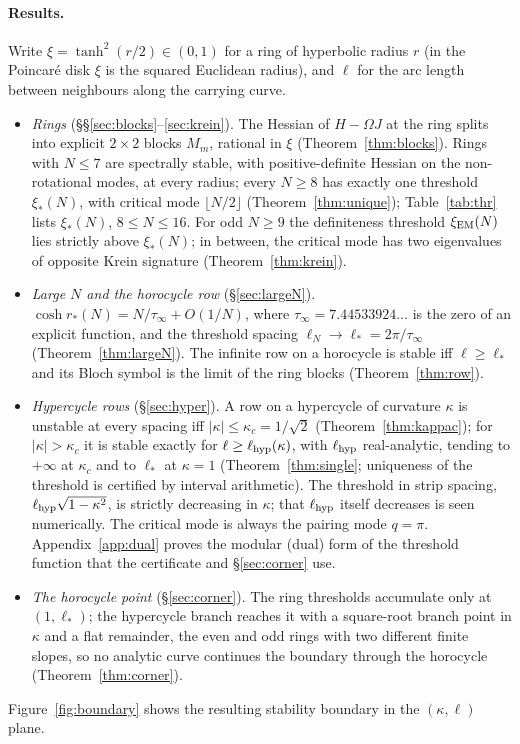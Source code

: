 \documentclass[11pt]{article}
\theoremstyle{definition}
\theoremstyle{remark}
\begin{document}
\paragraph{Results.} Write $\xi=\tanh^2(r/2)\in(0,1)$ for a ring of hyperbolic radius $r$ (in the Poincar\'e disk $\xi$ is
the squared Euclidean radius), and $\ell$ for the arc length between neighbours along the carrying curve.
\begin{itemize}
\item[\textbf{A.}] \emph{Rings} (\S\S\ref{sec:blocks}--\ref{sec:krein}). The Hessian of $H-\Omega J$ at the ring splits into
explicit $2\times2$ blocks $M_m$, rational in $\xi$ (Theorem~\ref{thm:blocks}). Rings with $N\le7$ are spectrally stable, with
positive-definite Hessian on the non-rotational modes, at every radius; every $N\ge8$ has exactly one threshold $\xi_*(N)$, with
critical mode $\lfloor N/2\rfloor$ (Theorem~\ref{thm:unique}); Table~\ref{tab:thr} lists $\xi_*(N)$, $8\le N\le16$. For odd
$N\ge9$ the definiteness threshold $\xi_{\rm EM}(N)$ lies strictly above $\xi_*(N)$; in between, the critical mode has two
eigenvalues of opposite Krein signature (Theorem~\ref{thm:krein}).
\item[\textbf{B.}] \emph{Large $N$ and the horocycle row} (\S\ref{sec:largeN}). $\cosh r_*(N)=N/\tau_\infty+O(1/N)$, where
$\tau_\infty=7.44533924\ldots$ is the zero of an explicit function, and the threshold spacing $\ell_N\to\ell_*=2\pi/\tau_\infty$
(Theorem~\ref{thm:largeN}). The infinite row on a horocycle is stable iff $\ell\ge\ell_*$ and its Bloch symbol is the limit
of the ring blocks (Theorem~\ref{thm:row}).
\item[\textbf{C.}] \emph{Hypercycle rows} (\S\ref{sec:hyper}). A row on a hypercycle of curvature $\kappa$ is unstable at every
spacing iff $|\kappa|\le\kappa_c=1/\sqrt2$ (Theorem~\ref{thm:kappac}); for $|\kappa|>\kappa_c$ it is stable exactly for
$\ell\ge\ell_{\rm hyp}(\kappa)$, with $\ell_{\rm hyp}$ real-analytic, tending to $+\infty$ at $\kappa_c$ and to $\ell_*$ at
$\kappa=1$ (Theorem~\ref{thm:single}; uniqueness of the threshold is certified by interval arithmetic). The threshold in strip spacing,
$\ell_{\rm hyp}\sqrt{1-\kappa^2}$, is strictly decreasing in $\kappa$; that $\ell_{\rm hyp}$ itself decreases is seen numerically. The
critical mode is always the pairing mode $q=\pi$. Appendix~\ref{app:dual} proves the modular (dual) form of the threshold function
that the certificate and \S\ref{sec:corner} use.
\item[\textbf{D.}] \emph{The horocycle point} (\S\ref{sec:corner}). The ring thresholds accumulate only at $(1,\ell_*)$; the
hypercycle branch reaches it with a square-root branch point in $\kappa$ and a flat remainder, the even and odd rings with two
different finite slopes, so no analytic curve continues the boundary through the horocycle (Theorem~\ref{thm:corner}).
\end{itemize}
Figure~\ref{fig:boundary} shows the resulting stability boundary in the $(\kappa,\ell)$ plane.
\end{document}
